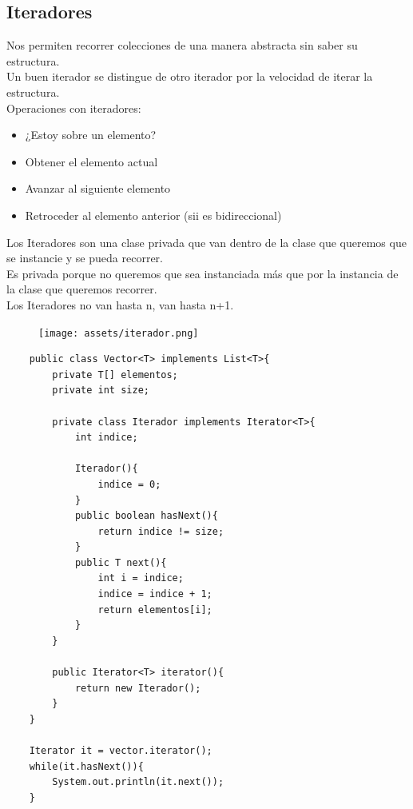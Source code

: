\documentclass[10pt,a4paper]{article}
\begin{document}
\subsection*{Iteradores}
Nos permiten recorrer colecciones de una manera abstracta sin saber su estructura. \\
Un buen iterador se distingue de otro iterador por la velocidad de iterar la estructura. \\
Operaciones con iteradores:
\begin{itemize}
    \item ¿Estoy sobre un elemento? 
    \item Obtener el elemento actual
    \item Avanzar al siguiente elemento
    \item Retroceder al elemento anterior (sii es bidireccional)
\end{itemize}
Los Iteradores son una clase privada que van dentro de la clase que queremos que se instancie y se pueda recorrer. \\
Es privada porque no queremos que sea instanciada más que por la instancia de la clase que queremos recorrer. \\
Los Iteradores no van hasta n, van hasta n+1.
\begin{figure}[h]
    \texttt{[image: assets/iterador.png]}
\end{figure}
\begin{lstlisting}
    public class Vector<T> implements List<T>{
        private T[] elementos;
        private int size;
        
        private class Iterador implements Iterator<T>{
            int indice;
            
            Iterador(){
                indice = 0;
            }
            public boolean hasNext(){
                return indice != size;
            }
            public T next(){
                int i = indice;
                indice = indice + 1;
                return elementos[i];
            }
        }

        public Iterator<T> iterator(){
            return new Iterador();
        }
    }

    Iterator it = vector.iterator();
    while(it.hasNext()){
        System.out.println(it.next());
    }
\end{lstlisting}
\end{document}
